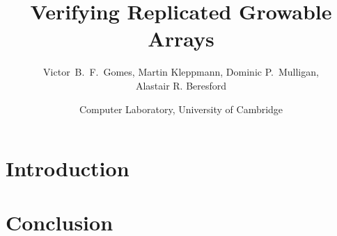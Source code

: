 \documentclass[letter,11pt]{article}
\title{Verifying Replicated Growable Arrays}
\author{Victor~B.~F.~Gomes, Martin Kleppmann, Dominic P.~Mulligan,\\Alastair R. Beresford}
\date{Computer Laboratory, University of Cambridge}
\begin{document}
\maketitle


\section{Introduction}
\label{sect.introduction}

\section{Conclusion}
\label{sect.conclusion}
\end{document}
